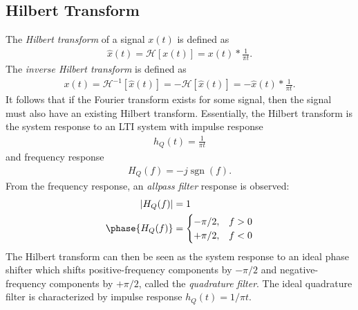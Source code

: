 \documentclass{report}
\begin{document}
\subsection{Hilbert Transform}
The \emph{Hilbert transform} of a signal $x(t)$ is defined as 
\begin{align}
    \hat{x}(t) = \mathcal{H}[x(t)] = x(t) * \frac{1}{\pi t}.
\end{align}
The \emph{inverse Hilbert transform} is defined as 
\begin{align}
    x(t) = \mathcal{H}^{-1}[\hat{x}(t)] = -\mathcal{H}[\hat{x}(t)] = -\hat{x}(t) * \frac{1}{\pi t}.
\end{align}
It follows that if the Fourier transform exists for some signal, then the signal must also have an existing Hilbert transform. 
Essentially, the Hilbert transform is the system response to an LTI system with impulse response 
\begin{align}
    h_Q(t) = \frac{1}{\pi t}
\end{align}
and frequency response
\begin{align}
    H_Q(f) = -j \operatorname{sgn}(f).
\end{align}
From the frequency response, an \emph{allpass filter} response is observed:
\begin{align}
    |H_Q(f)| &= 1 \\
    \phase{H_Q(f)} &= 
    \begin{cases}
        -\pi/2, & f>0 \\
        +\pi/2, & f<0
    \end{cases}
\end{align}
The Hilbert transform can then be seen as the system response to an ideal phase shifter which shifts positive-frequency components by $-\pi/2$ and 
negative-frequency components by $+\pi/2$, called the \emph{quadrature filter}. The ideal quadrature filter is characterized by impulse response $h_Q(t)=1/\pi t$.
\end{document}
